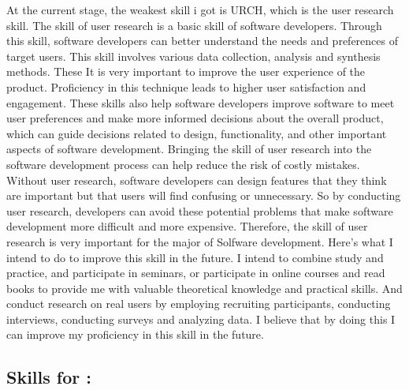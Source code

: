 \documentclass[a4paper, 11pt]{report}
\begin{document}
At the current stage, the weakest skill i got is URCH\cite{SFIA}, which is the user research skill. The skill of user research is a basic skill of software developers. Through this skill, software developers can better understand the needs and preferences of target users. This skill involves various data collection, analysis and synthesis methods. These It is very important to improve the user experience of the product. Proficiency in this technique leads to higher user satisfaction and engagement. These skills also help software developers improve software to meet user preferences and make more informed decisions about the overall product, which can guide decisions related to design, functionality, and other important aspects of software development. Bringing the skill of user research into the software development process can help reduce the risk of costly mistakes. Without user research, software developers can design features that they think are important but that users will find confusing or unnecessary. So by conducting user research, developers can avoid these potential problems that make software development more difficult and more expensive. Therefore, the skill of user research is very important for the major of Solfware development. Here's what I intend to do to improve this skill in the future. I intend to combine study and practice, and participate in seminars, or participate in online courses and read books to provide me with valuable theoretical knowledge and practical skills. And conduct research on real users by employing recruiting participants, conducting interviews, conducting surveys and analyzing data. I believe that by doing this I can improve my proficiency in this skill in the future.

\subsection{Skills for \majB: \studB}
\end{document}
